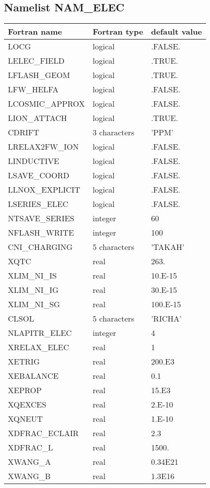 \subsection{Namelist NAM\_ELEC}
  \begin{center}
  \begin{tabular}{|l|l|l|}
    \hline
    Fortran name & Fortran type & default value \\
    \hline
    LOCG            & logical      & .FALSE. \\
    LELEC\_FIELD    & logical      & .TRUE.  \\
    LFLASH\_GEOM    & logical      & .TRUE.  \\
    LFW\_HELFA      & logical      & .FALSE. \\
    LCOSMIC\_APPROX & logical      & .FALSE. \\
    LION\_ATTACH    & logical      & .TRUE.  \\
    CDRIFT          & 3 characters & 'PPM'   \\
    LRELAX2FW\_ION  & logical      & .FALSE. \\
    LINDUCTIVE      & logical      & .FALSE. \\
    LSAVE\_COORD    & logical      & .FALSE. \\
    LLNOX\_EXPLICIT & logical      & .FALSE. \\
    LSERIES\_ELEC   & logical      & .FALSE. \\
    NTSAVE\_SERIES  & integer      & 60      \\
    NFLASH\_WRITE   & integer      & 100     \\
    CNI\_CHARGING   & 5 characters & 'TAKAH' \\
    XQTC            & real         & 263.    \\
    XLIM\_NI\_IS    & real         & 10.E-15 \\
    XLIM\_NI\_IG    & real         & 30.E-15 \\
    XLIM\_NI\_SG    & real         & 100.E-15\\
    CLSOL           & 5 characters & 'RICHA' \\
    NLAPITR\_ELEC   & integer      & 4       \\
    XRELAX\_ELEC    & real         & 1       \\
    XETRIG          & real         & 200.E3  \\
    XEBALANCE       & real         & 0.1     \\
    XEPROP          & real         & 15.E3   \\
    XQEXCES         & real         & 2.E-10  \\
    XQNEUT          & real         & 1.E-10  \\
    XDFRAC\_ECLAIR  & real         & 2.3     \\
    XDFRAC\_L       & real         & 1500.   \\
    XWANG\_A        & real         & 0.34E21 \\
    XWANG\_B        & real         & 1.3E16  \\
    \hline
  \end{tabular}
  \end{center}
